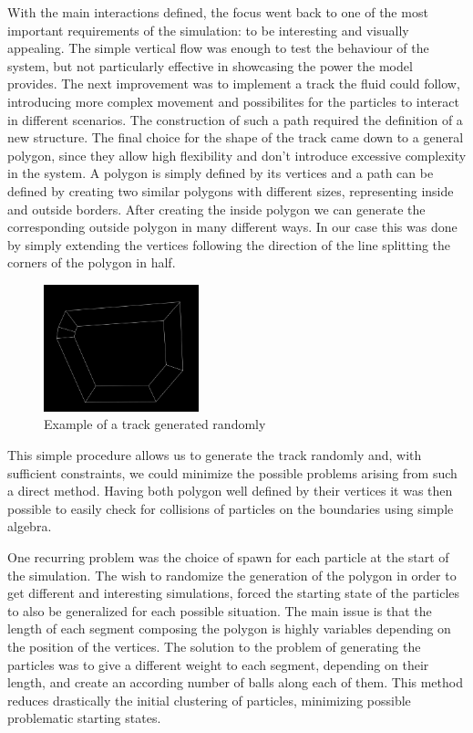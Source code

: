 \documentclass[]{usiinfbachelorproject}
\begin{document}
With the main interactions defined, the focus went back to one of the most important requirements of the 
simulation: to be interesting and visually appealing. The simple vertical flow was enough to test the behaviour 
of the system, but not particularly effective in showcasing the power the model provides. The next improvement was 
to implement a track the fluid could follow, introducing more complex movement and possibilites for the particles to 
interact in different scenarios. The construction of such a path required the definition of a new structure. The final choice 
for the shape of the track came down to a general polygon, since they allow high flexibility and don't introduce 
excessive complexity in the system. A polygon is simply defined by its vertices and a path can be defined by creating 
two similar polygons with different sizes, representing inside and outside borders. After creating the inside polygon we can 
generate the corresponding outside polygon in many different ways. In our case this was done by simply extending the vertices following 
the direction of the line splitting the corners of the polygon in half. 

\begin{figure} [ht]
  \centering
  \includegraphics[width=0.4\textwidth]{polygon.png}
  \caption{Example of a track generated randomly}
  \label{fig:Polygon}
\end{figure}

This simple procedure allows us to generate the track randomly and, with sufficient constraints, we could minimize the possible 
problems arising from such a direct method. Having both polygon well defined by their vertices it was 
then possible to easily check for collisions of particles on the boundaries using simple algebra.

One recurring problem was the choice of spawn for each particle at the start of the simulation. The wish to randomize the 
generation of the polygon in order to get different and interesting simulations, forced the starting state of the particles 
to also be generalized for each possible situation. The main issue is that the length of each segment 
composing the polygon is highly variables depending on the position of the vertices. The solution to the problem 
of generating the particles was to give a different weight to each segment, depending on their length, and create an 
according number of balls along each of them. This method reduces drastically the initial clustering of particles, minimizing 
possible problematic starting states.
\end{document}
